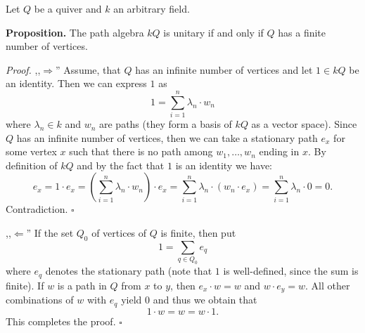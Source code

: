 \documentclass[12pt]{article}
\begin{document}
Let $Q$ be a quiver and $k$ an arbitrary field.

\textbf{Proposition.} The path algebra $kQ$ is unitary if and only if $Q$ has a finite number of vertices.

\textit{Proof.}
,,$\Rightarrow$'' Assume, that $Q$ has an infinite number of vertices and let $1\in kQ$ be an identity. Then we can express $1$ as
$$1=\sum_{i=1}^{n}\lambda_n\cdot w_n$$
where $\lambda_n\in k$ and $w_n$ are paths (they form a basis of $kQ$ as a vector space). Since $Q$ has an infinite number of vertices, then we can take a stationary path $e_x$ for some vertex $x$ such that there is no path among ${w_1,\ldots,w_n}$ ending in $x$. By definition of $kQ$ and by the fact that $1$ is an identity we have:
$$e_x = 1\cdot e_x=\left(\sum_{i=1}^{n}\lambda_n\cdot w_n\right)\cdot e_x=\sum_{i=1}^{n}\lambda_n\cdot (w_n\cdot e_x)=\sum_{i=1}^{n}\lambda_n\cdot 0 = 0.$$
Contradiction. $\square$

,,$\Leftarrow$'' If the set $Q_0$ of vertices of $Q$ is finite, then put
$$1=\sum_{q\in Q_0}e_q$$
where $e_q$ denotes the stationary path (note that $1$ is well-defined, since the sum is finite). If $w$ is a path in $Q$ from $x$ to $y$, then $e_x\cdot w=w$ and $w\cdot e_y=w$. All other combinations of $w$ with $e_q$ yield $0$ and thus we obtain that
$$1\cdot w = w = w\cdot 1.$$
This completes the proof. $\square$
\end{document}
